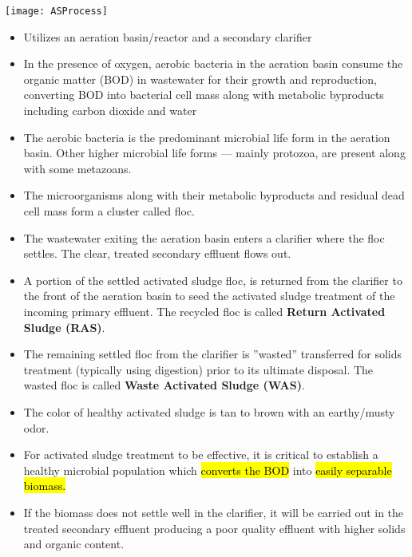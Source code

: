 \documentclass{article}
\begin{document}
\begin{center}
\texttt{[image: ASProcess]}
\end{center}
\begin{itemize}

\item Utilizes an aeration basin/reactor and a secondary clarifier

\item In the presence of oxygen, aerobic bacteria in the aeration basin consume the organic matter (BOD) in wastewater for their growth and reproduction, converting BOD into bacterial cell mass along with metabolic byproducts including carbon dioxide and water

\item The aerobic bacteria is the predominant microbial life form in the aeration basin.  Other higher microbial life forms — mainly protozoa, are present along with some metazoans.

\item The microorganisms along with their metabolic byproducts and residual dead cell mass form a cluster called floc.

\item The wastewater exiting the aeration basin enters a clarifier where the floc settles.  The clear, treated secondary effluent flows out.

\item A portion of the settled activated sludge floc, is returned from the clarifier to the front of the aeration basin to seed the activated sludge treatment of the incoming primary effluent. The recycled floc is called \textbf{Return Activated Sludge (RAS)}.

\item The remaining settled floc from the clarifier is ”wasted” \textemdash transferred for solids treatment (typically using digestion) prior to its ultimate disposal. The wasted floc is called \textbf{Waste Activated Sludge (WAS)}.

\item The color of healthy activated sludge is tan to brown with an earthy/musty odor.

\item For activated sludge treatment to be effective, it is critical to establish a healthy microbial population which \hl{converts the BOD} into \hl{easily separable biomass.}
\item If the biomass does not settle well in the clarifier, it will be carried out in the treated secondary effluent producing a poor quality effluent with higher solids and organic content.  \\
\end{itemize}
\end{document}
